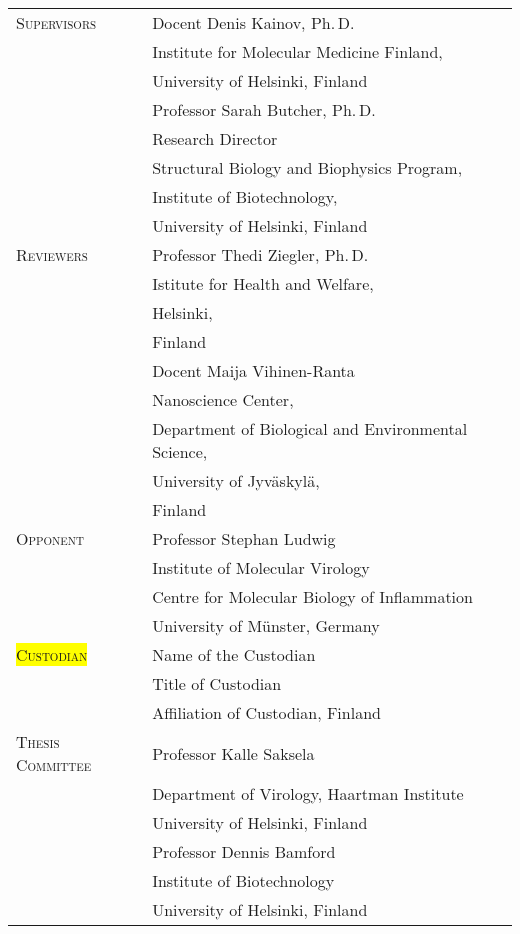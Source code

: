 \documentclass[a4paper,12pt]{article} %
\begin{document}
	\begin{tabular}{p{4.5cm}l}
		\textsc{Supervisors} & Docent Denis Kainov, Ph.\,D.\\
		& Institute for Molecular Medicine Finland,\\
		& University of Helsinki, Finland \\
	\rule[0.6 cm]{0pt}{0pt}	& Professor Sarah Butcher, Ph.\,D.\\
		& Research Director \\
		& Structural Biology and Biophysics Program,\\
		& Institute of Biotechnology,\\
		& University of Helsinki, Finland\\
	\rule[1 cm]{0pt}{0pt}	\textsc{Reviewers} & Professor Thedi Ziegler, Ph.\,D. \\
		& Istitute for Health and Welfare, \\
		& Helsinki, \\
		& Finland \\
	\rule[0.6 cm]{0pt}{0pt}	& Docent Maija Vihinen-Ranta \\
		& Nanoscience Center, \\
		& Department of  Biological and Environmental Science, \\
		& University of Jyv\"{a}skyl\"{a}, \\
		& Finland \\
	\rule[1 cm]{0pt}{0pt}	\textsc{Opponent} & Professor Stephan Ludwig \\
		& Institute of Molecular Virology \\
		& Centre for Molecular Biology of Inflammation \\
		& University of M\"{u}nster, Germany \\
	\rule[1 cm]{0pt}{0pt}	\fboxsep=0pt\colorbox{yellow}{\textsc{Custodian}} & Name of the Custodian \\
		& Title of Custodian \\
		& Affiliation of Custodian, Finland \\
	\rule[1 cm]{0pt}{0pt} \textsc{Thesis Committee} & Professor Kalle Saksela \\
		& Department of Virology, Haartman Institute \\
		& University of Helsinki, Finland \\
	\rule[0.6 cm]{0pt}{0pt}	& Professor Dennis Bamford \\
		& Institute of Biotechnology \\
		& University of Helsinki, Finland\\
	\end{tabular} 
\end{document}
